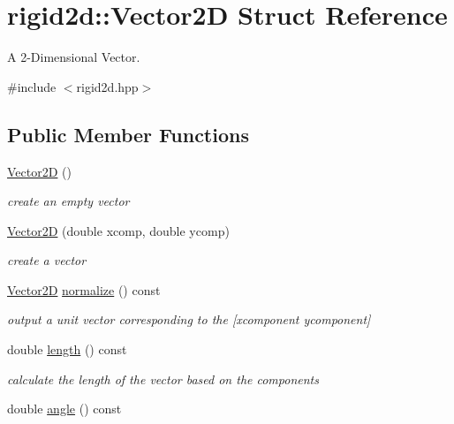 \hypertarget{structrigid2d_1_1Vector2D}{}\section{rigid2d\+:\+:Vector2D Struct Reference}
\label{structrigid2d_1_1Vector2D}


A 2-\/\+Dimensional Vector.  




{\ttfamily \#include $<$rigid2d.\+hpp$>$}

\subsection*{Public Member Functions}
\begin{DoxyCompactItemize}
\item 
\mbox{\label{structrigid2d_1_1Vector2D_aa268d230fdd3ddc7b5f89e6277ee60da}} 
\hyperlink{structrigid2d_1_1Vector2D_aa268d230fdd3ddc7b5f89e6277ee60da}{Vector2D} ()
\begin{DoxyCompactList}\small\item\em create an empty vector \end{DoxyCompactList}\item 
\hyperlink{structrigid2d_1_1Vector2D_a26d3fdc99cc873ff8785a70b7f379463}{Vector2D} (double xcomp, double ycomp)
\begin{DoxyCompactList}\small\item\em create a vector \end{DoxyCompactList}\item 
\hyperlink{structrigid2d_1_1Vector2D}{Vector2D} \hyperlink{structrigid2d_1_1Vector2D_a6534f1075f8f3338261331c954b449b2}{normalize} () const
\begin{DoxyCompactList}\small\item\em output a unit vector corresponding to the \mbox{[}xcomponent ycomponent\mbox{]} \end{DoxyCompactList}\item 
double \hyperlink{structrigid2d_1_1Vector2D_afe2117dc061b3f09c890ac13dd59c345}{length} () const
\begin{DoxyCompactList}\small\item\em calculate the length of the vector based on the components \end{DoxyCompactList}\item 
double \hyperlink{structrigid2d_1_1Vector2D_a61ec013677fd4439fa21c35656fe7256}{angle} () const

\end{DoxyCompactItemize}
